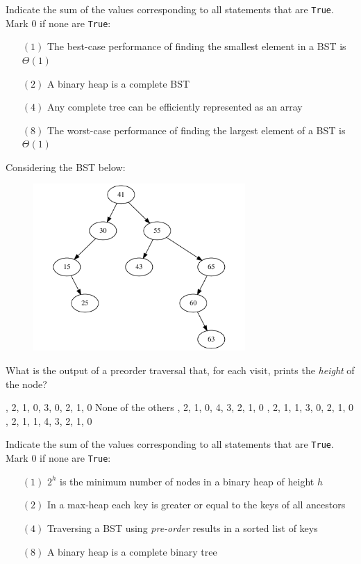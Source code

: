 \documentclass[12pt,addpoints]{exam}
\begin{document}
\begin{questions}

\question[5] 
Indicate the sum of the values corresponding to all statements that are \verb|True|.  Mark $0$ if none are \verb|True|:
\begin{itemize}
	\item[$(1)$] The best-case performance of finding the smallest element in a BST is $\Theta(1)$
	\item[$(2)$] A binary heap is a complete BST
	\item[$(4)$] Any complete tree can be efficiently represented as an array
	\item[$(8)$] The worst-case performance of finding the largest element of a BST is $\Theta(1)$\end{itemize}
\answerline

\question[5] Considering the BST below:
\begin{figure}[h!]
  \centering
  \includegraphics[height=2.5in]{imgs/bst.pdf}
\end{figure}

What is the output of a preorder traversal that, for each visit, prints the {\it height} of the node?
\begin{choices}	
	, 2, 1, 0, 3, 0, 2, 1, 0	
	\choice None of the others	
	, 2, 1, 0, 4, 3, 2, 1, 0	
	, 2, 1, 1, 3, 0, 2, 1, 0	
	, 2, 1, 1, 4, 3, 2, 1, 0
\end{choices}
\answerline

\question[5] 
Indicate the sum of the values corresponding to all statements that are \verb|True|.  Mark $0$ if none are \verb|True|:
\begin{itemize}
	\item[$(1)$] $2^h$ is the minimum number of nodes in a binary heap of height $h$
	\item[$(2)$] In a max-heap each key is greater or equal to the keys of all ancestors
	\item[$(4)$] Traversing a BST using {\it pre-order} results in a sorted list of keys
	\item[$(8)$] A binary heap is a complete binary tree\end{itemize}
\answerline


\end{questions}
\end{document}
